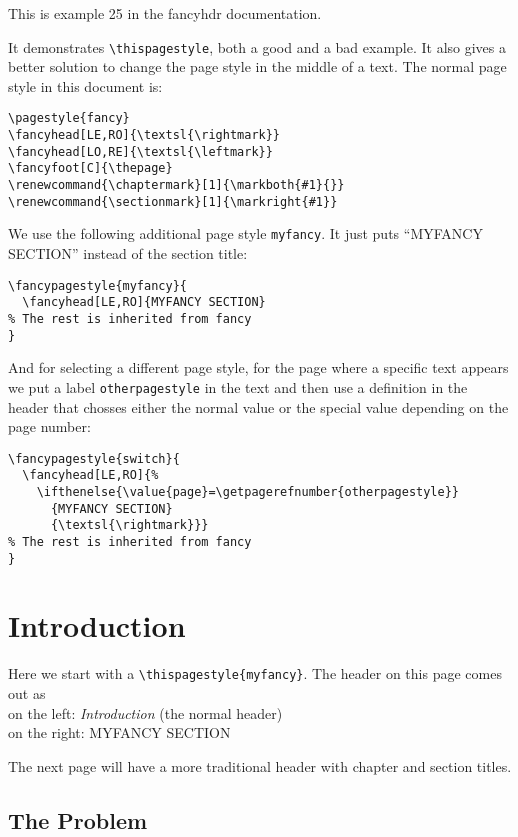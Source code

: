 \documentclass[openany]{book}
\renewcommand{\chaptermark}[1]{\markboth{#1}{}}
\renewcommand{\sectionmark}[1]{\markright{#1}}
\begin{document}
\tableofcontents
\newpage
\thispagestyle{plain}
\noindent
\begin{boxedminipage}{\textwidth}
This is example 25 in the fancyhdr documentation.

It demonstrates \verb|\thispagestyle|, both a good and a bad example.
It also gives a better solution to change the page style in the middle of a text.
The normal page style in this document is:
\begin{verbatim}
\pagestyle{fancy}
\fancyhead[LE,RO]{\textsl{\rightmark}}
\fancyhead[LO,RE]{\textsl{\leftmark}}
\fancyfoot[C]{\thepage}
\renewcommand{\chaptermark}[1]{\markboth{#1}{}}
\renewcommand{\sectionmark}[1]{\markright{#1}}
\end{verbatim}
We use the following additional page style \texttt{myfancy}. It just puts ``MYFANCY SECTION'' instead of the section title:
\begin{verbatim}
\fancypagestyle{myfancy}{
  \fancyhead[LE,RO]{MYFANCY SECTION}
% The rest is inherited from fancy
}
\end{verbatim}
And for selecting a different page style, for the page where a specific text appears we put a label \texttt{otherpagestyle} in the text and then use a definition in the header that chosses either the normal value or the special value depending on the page number:
\begin{verbatim}
\fancypagestyle{switch}{
  \fancyhead[LE,RO]{%
    \ifthenelse{\value{page}=\getpagerefnumber{otherpagestyle}}
      {MYFANCY SECTION}
      {\textsl{\rightmark}}}
% The rest is inherited from fancy
}
\end{verbatim}

\end{boxedminipage}

\chapter{Introduction}
\thispagestyle{myfancy}

Here we start with a \verb|\thispagestyle{myfancy}|. The header on this page comes out as\\
on the left: \textsl{Introduction} (the normal header)\\
on the right: MYFANCY SECTION

The next page will have a more traditional header with chapter and section titles.

\bigskip

\lipsum[1]

\section{The Problem}
\label{sec:problem}
\end{document}
